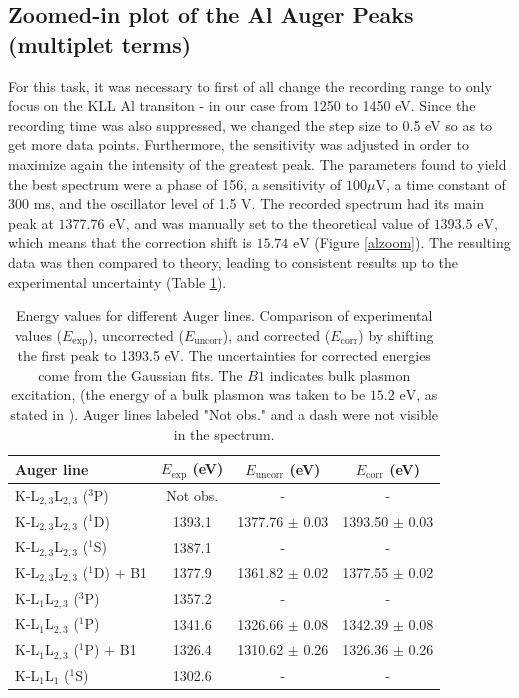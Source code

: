 \documentclass[12pt]{article}
\begin{document}
\subsection{Zoomed-in plot of the Al Auger Peaks (multiplet terms)}
For this task, it was necessary to first of all change the recording range to only focus on the KLL Al transiton - in our case from 1250 to 1450 eV. %
Since the recording time was also suppressed, we changed the step size to 0.5 eV so as to get more data points.
Furthermore, the sensitivity was adjusted in order to maximize again the intensity of the greatest peak.
The parameters found to yield the best spectrum were a phase of 156\degree, a sensitivity of $100 \mu $V, a time constant of 300 ms, and the oscillator level of 1.5 V.
The recorded spectrum had its main peak at $1377.76\text{ eV}$, and was manually set to the theoretical value of $1393.5\text{ eV}$, which means that the correction shift is $15.74 \text{ eV}$ (Figure \ref{alzoom}). The resulting data was then compared to theory, leading to consistent results up to the experimental uncertainty (Table \ref{tab:transition_exp}).

\begin{table}[h!]
    \centering
    \begin{tabular}{lccc}
        \toprule
        \textbf{Auger line} & \textbf{\(E_{\text{exp}}\) (eV)} & \textbf{\(E_{\text{uncorr}}\) (eV)} & \textbf{\(E_{\text{corr}}\) (eV)} \\
        \midrule
        K-L$_{2,3}$L$_{2,3}$ ($^{3}$P) & Not obs. & - & - \\
        K-L$_{2,3}$L$_{2,3}$ ($^{1}$D) & 1393.1 & 1377.76 $\pm$ 0.03 & 1393.50 $\pm$ 0.03 \\
        K-L$_{2,3}$L$_{2,3}$ ($^{1}$S) & 1387.1 & - & - \\
        K-L$_{2,3}$L$_{2,3}$ ($^{1}$D) + B1 & 1377.9 & 1361.82 $\pm$ 0.02 & 1377.55 $\pm$ 0.02 \\
        K-L$_{1}$L$_{2,3}$ ($^{3}$P) & 1357.2 & - & - \\
        K-L$_{1}$L$_{2,3}$ ($^{1}$P) & 1341.6 & 1326.66 $\pm$ 0.08 & 1342.39 $\pm$ 0.08 \\
        K-L$_{1}$L$_{2,3}$ ($^{1}$P) + B1 & 1326.4 & 1310.62 $\pm$ 0.26 & 1326.36 $\pm$ 0.26 \\
        K-L$_{1}$L$_{1}$ ($^{1}$S) & 1302.6 & - & - \\
        \bottomrule
    \end{tabular}
    \caption{Energy values for different Auger lines. Comparison of experimental values (\(E_{\text{exp}}\)), uncorrected (\(E_{\text{uncorr}}\)), and corrected (\(E_{\text{corr}}\)) by shifting the first peak to 1393.5 eV. The uncertainties for corrected energies come from the Gaussian fits. The $B1$ indicates bulk plasmon excitation, (the energy of a bulk plasmon was taken to be $15.2 \text{ eV}$, as stated in \cite{dufor}). Auger lines labeled "Not obs." and a dash were not visible in the spectrum.}
    \label{tab:transition_exp}
\end{table}
\end{document}
